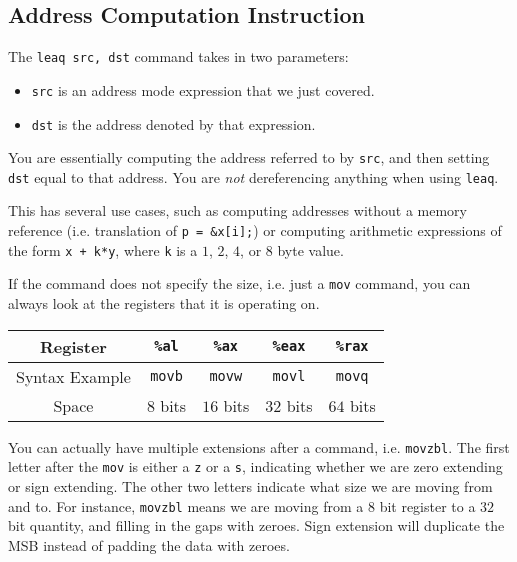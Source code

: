 \documentclass[class=article, crop=false]{standalone}
\begin{document}
  \subsection{Address Computation Instruction}
  The \texttt{leaq src, dst} command takes in two parameters:
  \begin{itemize}
    \item \texttt{src} is an address mode expression that we just covered.
    \item \texttt{dst} is the address denoted by that expression.
  \end{itemize}
  \begin{note}{}
    You are essentially computing the address referred to by \texttt{src}, and then setting \texttt{dst} equal to that address. You are \emph{not} dereferencing anything when using \texttt{leaq}.
  \end{note}
  This has several use cases, such as computing addresses without a memory reference (i.e. translation of \texttt{p = \&x[i];}) or computing arithmetic expressions of the form \texttt{x + k*y}, where \texttt{k} is a $1$, $2$, $4$, or $8$ byte value.
  \begin{note}{}
    If the command does not specify the size, i.e. just a \texttt{mov} command, you can always look at the registers that it is operating on.
  \end{note}
  \begin{center}\begin{tabular}{c|c|c|c|c}
    Register & \texttt{\%al} & \texttt{\%ax} & \texttt{\%eax} & \texttt{\%rax} \\
    \hline
    Syntax Example & \texttt{movb} & \texttt{movw} & \texttt{movl} & \texttt{movq} \\
    \hline
    Space & $8$ bits & $16$ bits & $32$ bits & $64$ bits
  \end{tabular}\end{center}
  You can actually have multiple extensions after a command, i.e. \texttt{movzbl}. The first letter after the \texttt{mov} is either a \texttt{z} or a \texttt{s}, indicating whether we are zero extending or sign extending. The other two letters indicate what size we are moving from and to. For instance, \texttt{movzbl} means we are moving from a $8$ bit register to a $32$ bit quantity, and filling in the gaps with zeroes. Sign extension will duplicate the MSB instead of padding the data with zeroes.
\end{document}
